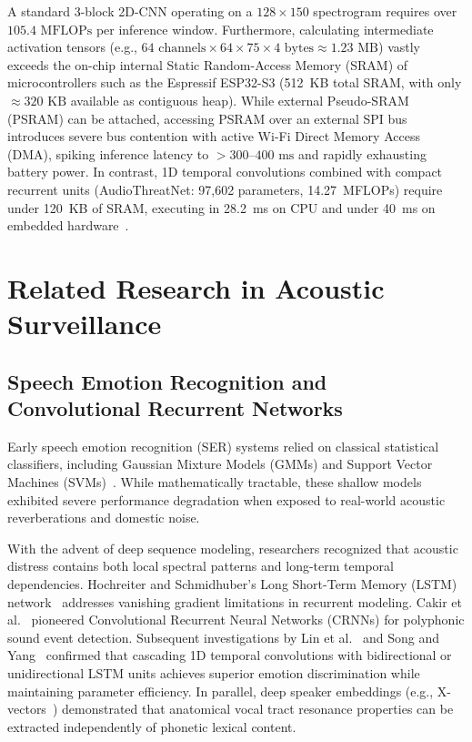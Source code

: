 \documentclass[12pt, a4paper]{report}
\begin{document}
A standard 3-block 2D-CNN operating on a $128 \times 150$ spectrogram requires over $105.4\text{ MFLOPs}$ per inference window. Furthermore, calculating intermediate activation tensors (e.g., $64\text{ channels} \times 64 \times 75 \times 4\text{ bytes} \approx 1.23\text{ MB}$) vastly exceeds the on-chip internal Static Random-Access Memory (SRAM) of microcontrollers such as the Espressif ESP32-S3 (512~KB total SRAM, with only $\approx 320\text{ KB}$ available as contiguous heap). While external Pseudo-SRAM (PSRAM) can be attached, accessing PSRAM over an external SPI bus introduces severe bus contention with active Wi-Fi Direct Memory Access (DMA), spiking inference latency to $> 300\text{--}400\text{ ms}$ and rapidly exhausting battery power. In contrast, 1D temporal convolutions combined with compact recurrent units (AudioThreatNet: 97,602 parameters, 14.27~MFLOPs) require under 120~KB of SRAM, executing in 28.2~ms on CPU and under 40~ms on embedded hardware~\cite{ref_neri2022}.

\section{Related Research in Acoustic Surveillance}

\subsection{Speech Emotion Recognition and Convolutional Recurrent Networks}
Early speech emotion recognition (SER) systems relied on classical statistical classifiers, including Gaussian Mixture Models (GMMs) and Support Vector Machines (SVMs)~\cite{ref_nwe2003, ref_schuller2011}. While mathematically tractable, these shallow models exhibited severe performance degradation when exposed to real-world acoustic reverberations and domestic noise.

With the advent of deep sequence modeling, researchers recognized that acoustic distress contains both local spectral patterns and long-term temporal dependencies. Hochreiter and Schmidhuber's Long Short-Term Memory (LSTM) network~\cite{ref_hochreiter1997} addresses vanishing gradient limitations in recurrent modeling. Cakir et al.~\cite{ref_cakir2017} pioneered Convolutional Recurrent Neural Networks (CRNNs) for polyphonic sound event detection. Subsequent investigations by Lin et al.~\cite{ref_lin2020} and Song and Yang~\cite{ref_song2023} confirmed that cascading 1D temporal convolutions with bidirectional or unidirectional LSTM units achieves superior emotion discrimination while maintaining parameter efficiency. In parallel, deep speaker embeddings (e.g., X-vectors~\cite{ref_snyder2018}) demonstrated that anatomical vocal tract resonance properties can be extracted independently of phonetic lexical content.
\end{document}
